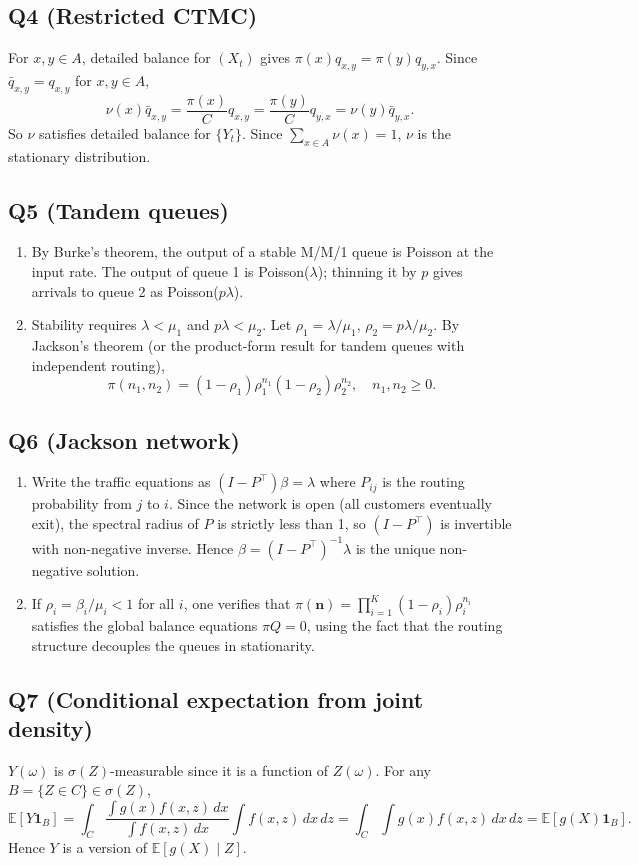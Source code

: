 \documentclass[11pt]{article}
\newcommand{\EE}{\mathbb{E}}
\newcommand{\1}{\mathbf{1}}
\begin{document}
\subsection*{Q4 (Restricted CTMC)}
For $x,y\in A$, detailed balance for $(X_t)$ gives $\pi(x)q_{x,y}=\pi(y)q_{y,x}$.  Since $\bar q_{x,y}=q_{x,y}$ for $x,y\in A$,
\[
\nu(x)\bar q_{x,y}=\frac{\pi(x)}{C}q_{x,y}=\frac{\pi(y)}{C}q_{y,x}=\nu(y)\bar q_{y,x}.
\]
So $\nu$ satisfies detailed balance for $\{Y_t\}$.  Since $\sum_{x\in A}\nu(x)=1$, $\nu$ is the stationary distribution.

\subsection*{Q5 (Tandem queues)}
\begin{enumerate}[label=(\alph*)]
\item By Burke's theorem, the output of a stable M/M/1 queue is Poisson at the input rate.  The output of queue 1 is Poisson($\lambda$); thinning it by $p$ gives arrivals to queue 2 as Poisson($p\lambda$).
\item Stability requires $\lambda<\mu_1$ and $p\lambda<\mu_2$.  Let $\rho_1=\lambda/\mu_1$, $\rho_2=p\lambda/\mu_2$.  By Jackson's theorem (or the product-form result for tandem queues with independent routing),
\[
\pi(n_1,n_2)=(1-\rho_1)\rho_1^{n_1}(1-\rho_2)\rho_2^{n_2},\quad n_1,n_2\ge0.
\]
\end{enumerate}

\subsection*{Q6 (Jackson network)}
\begin{enumerate}[label=(\alph*)]
\item Write the traffic equations as $(I-P^\top)\beta=\lambda$ where $P_{ij}$ is the routing probability from $j$ to $i$.  Since the network is open (all customers eventually exit), the spectral radius of $P$ is strictly less than 1, so $(I-P^\top)$ is invertible with non-negative inverse.  Hence $\beta=(I-P^\top)^{-1}\lambda$ is the unique non-negative solution.
\item If $\rho_i=\beta_i/\mu_i<1$ for all $i$, one verifies that $\pi(\mathbf n)=\prod_{i=1}^K(1-\rho_i)\rho_i^{n_i}$ satisfies the global balance equations $\pi Q=0$, using the fact that the routing structure decouples the queues in stationarity.
\end{enumerate}

\subsection*{Q7 (Conditional expectation from joint density)}
$Y(\omega)$ is $\sigma(Z)$-measurable since it is a function of $Z(\omega)$.  For any $B=\{Z\in C\}\in\sigma(Z)$,
\[
\EE[Y\1_B]=\int_C\frac{\int g(x)f(x,z)\,dx}{\int f(x,z)\,dx}\int f(x,z)\,dx\,dz
=\int_C\!\int g(x)f(x,z)\,dx\,dz=\EE[g(X)\1_B].
\]
Hence $Y$ is a version of $\EE[g(X)\mid Z]$.
\end{document}
